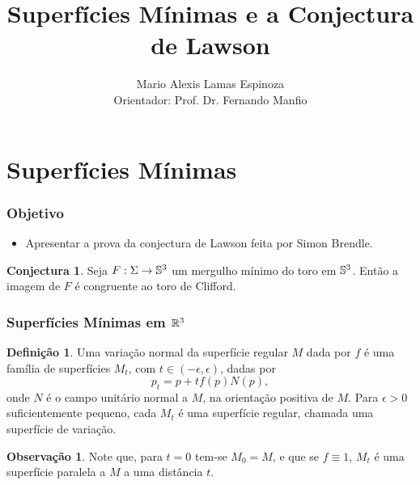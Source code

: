 \documentclass[12pt,a4paper]{beamer}
\author{Mario Alexis Lamas Espinoza \\ Orientador: Prof. Dr. Fernando Manfio}
\title{Superfícies Mínimas e a Conjectura de Lawson}
\institute[ICMC]{Instituto de Ciências Matemáticas e de Computação}
\theoremstyle{definition}
\newtheorem{definicao}{Definição}
\newtheorem{observacao}{Observação}
\newtheorem{conjectura}{Conjectura}
\begin{document}
\begin{frame}
	\maketitle	
\end{frame}

\section{Superfícies Mínimas}

\begin{frame}
	\frametitle{Objetivo}
	
	\begin{itemize}
		\item Apresentar a prova da conjectura de Lawson feita por Simon Brendle.
	\end{itemize}

	\pause
	\vspace{1cm}

	\begin{conjectura}
		Seja $F: \Sigma \rightarrow \mathbb{S}^3$ um mergulho mínimo do toro em $\mathbb{S}^3$. Então a imagem de $F$ é congruente ao toro de Clifford.
	\end{conjectura}
\end{frame}

\begin{frame}
	\frametitle{Superfícies Mínimas em $\mathbb R^3$}
	
	\begin{definicao}
		Uma \alert{variação normal} da superfície regular $M$ dada por $f$ é uma família de superfícies $M_t$, com $t \in (-\epsilon,\epsilon)$, dadas por
		\begin{equation*}
		p_t = p + t f(p) N(p),
		\end{equation*}
		onde $N$ é o campo unitário normal a $M$, na orientação positiva de $M$. Para $\epsilon > 0$ suficientemente pequeno, cada $M_t$ é uma superfície regular, chamada uma \alert{superfície de variação}.
	\end{definicao}

	\pause

	\begin{observacao}
		Note que, para $t=0$ tem-se $M_0 = M$, e que se $f \equiv 1$, $M_t$ é uma \alert{superfície paralela} a $M$ a uma distância $t$.
	\end{observacao}

\end{frame}
\end{document}
